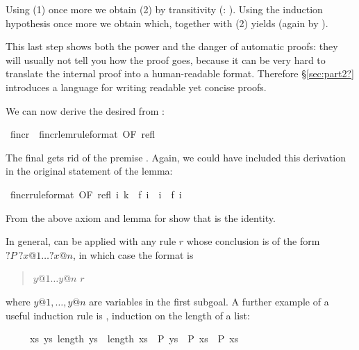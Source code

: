\begin{isabellebody}
\begin{isamarkuptext}
Using (1) once more we obtain  (2) by transitivity
(: ).
Using the induction hypothesis once more we obtain 
which, together with (2) yields  (again by
).

This last step shows both the power and the danger of automatic proofs: they
will usually not tell you how the proof goes, because it can be very hard to
translate the internal proof into a human-readable format. Therefore
\S\ref{sec:part2?} introduces a language for writing readable yet concise
proofs.

We can now derive the desired  from :%
\end{isamarkuptext}%
\ f{\isacharunderscore}incr\ {\isacharequal}\ f{\isacharunderscore}incr{\isacharunderscore}lem{\isacharbrackleft}rule{\isacharunderscore}format{\isacharcomma}\ OF\ refl{\isacharbrackright}%
\begin{isamarkuptext}%
\noindent
The final  gets rid of the premise . Again,
we could have included this derivation in the original statement of the lemma:%
\end{isamarkuptext}%
\ f{\isacharunderscore}incr{\isacharbrackleft}rule{\isacharunderscore}format{\isacharcomma}\ OF\ refl{\isacharbrackright}{\isacharcolon}\ {\isachardoublequote}{\isasymforall}i{\isachardot}\ k\ {\isacharequal}\ f\ i\ {\isasymlongrightarrow}\ i\ {\isasymle}\ f\ i{\isachardoublequote}%
\begin{isamarkuptext}%
\begin{exercise}
From the above axiom and lemma for  show that  is the
identity.
\end{exercise}

In general,  can be applied with any rule $r$
whose conclusion is of the form ${?}P~?x@1 \dots ?x@n$, in which case the
format is
\begin{quote}
 $y@1 \dots y@n$  $r$\isa{{\isacharparenright}}
\end{quote}%
where $y@1, \dots, y@n$ are variables in the first subgoal.
A further example of a useful induction rule is ,
induction on the length of a list:
\begin{isabelle}%
\ \ \ \ \ {\isacharparenleft}{\isasymAnd}xs{\isachardot}\ {\isasymforall}ys{\isachardot}\ length\ ys\ {\isacharless}\ length\ xs\ {\isasymlongrightarrow}\ P\ ys\ {\isasymLongrightarrow}\ P\ xs{\isacharparenright}\ {\isasymLongrightarrow}\ P\ xs%
\end{isabelle}


\end{isamarkuptext}
\end{isabellebody}
